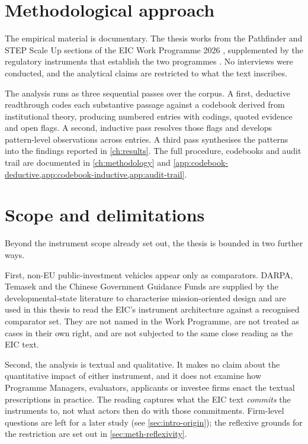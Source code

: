 \section{Methodological approach}
\label{sec:intro-method}
The empirical material is documentary. The thesis works from the
Pathfinder and STEP Scale Up sections of the EIC Work Programme 2026
\parencite{ec2025eicwp}, supplemented by the regulatory instruments
that establish the two programmes \parencite{eu2024step}. No interviews
were conducted, and the analytical claims are restricted to what the
text inscribes.

The analysis runs as three sequential passes over the corpus. A first,
deductive readthrough codes each substantive passage against a codebook
derived from institutional theory, producing numbered entries with
codings, quoted evidence and open flags. A second, inductive pass
resolves those flags and develops pattern-level observations across
entries. A third pass synthesises the patterns into the findings
reported in \cref{ch:results}. The full procedure, codebooks and audit
trail are documented in \cref{ch:methodology} and
\cref{app:codebook-deductive,app:codebook-inductive,app:audit-trail}.

\section{Scope and delimitations}
\label{sec:intro-scope}
Beyond the instrument scope already set out, the thesis is bounded in
two further ways.

First, non-EU public-investment vehicles appear only as comparators.
DARPA, Temasek and the Chinese Government Guidance Funds are supplied
by the developmental-state literature to characterise mission-oriented
design and are used in this thesis to read the EIC's instrument
architecture against a recognised comparator set. They are not named
in the Work Programme, are not treated as cases in their own right,
and are not subjected to the same close reading as the EIC text.

Second, the analysis is textual and qualitative. It makes no claim
about the quantitative impact of either instrument, and it does not
examine how Programme Managers, evaluators, applicants or investee
firms enact the textual prescriptions in practice. The reading
captures what the EIC text \emph{commits} the instruments to, not what
actors then do with those commitments. Firm-level questions are left
for a later study (see \cref{sec:intro-origin}); the reflexive grounds
for the restriction are set out in \cref{sec:meth-reflexivity}.

